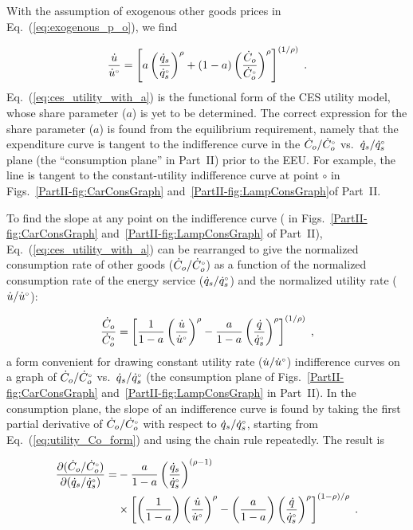 \documentclass[12pt]{article}\usepackage[]{graphicx}\usepackage[]{xcolor}
\begin{document}
With the assumption of exogenous other goods prices 
in Eq.~(\ref{eq:exogenous_p_o}), 
we find

\begin{equation} \label{eq:ces_utility_with_a}
  \frac{\dot{u}}{{}{\dot{u}}^{\scriptscriptstyle \circ}} = 
  \left[ a \left( \frac{\dot{q}_s}{{}{\dot{q}}^{\scriptscriptstyle \circ}_s} \right)^\rho 
        + (1-a) \left( \frac{\dot{C}_o}{{}{\dot{C}}^{\scriptscriptstyle \circ}_o} \right)^\rho  \right]^{(1/\rho)} \; .
\end{equation}
%
Eq.~(\ref{eq:ces_utility_with_a}) is the functional form of the CES utility model,
whose share parameter ($a$) is yet to be determined.
The correct expression for the share parameter ($a$) is found from the 
equilibrium requirement,
namely that the expenditure curve 
is tangent to the indifference curve
in the $\dot{C}_o/{}{\dot{C}}^{\scriptscriptstyle \circ}_o$ vs.\ $\dot{q}_s/{}{\dot{q}}^{\scriptscriptstyle \circ}_s$ plane
(the ``consumption plane'' in Part~II)
prior to the EEU.
For example, the \circcirc{} line is tangent 
to the constant-utility 
indifference curve \iicirc{} at point $\circ$
in Figs.~\ref{PartII-fig:CarConsGraph} 
and~\ref{PartII-fig:LampConsGraph}of Part~II.

To find the slope at any point on the indifference curve 
(\iicirc{} in Figs.~\ref{PartII-fig:CarConsGraph} 
and~\ref{PartII-fig:LampConsGraph} of Part~II),
Eq.~(\ref{eq:ces_utility_with_a}) can be rearranged to give 
the normalized consumption rate of other goods ($\dot{C}_o/{}{\dot{C}}^{\scriptscriptstyle \circ}_o$)
as a function of the normalized consumption rate of the energy service
($\dot{q}_s/{}{\dot{q}}^{\scriptscriptstyle \circ}_s$)
and the normalized utility rate ($\dot{u}/{}{\dot{u}}^{\scriptscriptstyle \circ}$):

\begin{equation} \label{eq:utility_Co_form}
  \frac{\dot{C}_o}{{}{\dot{C}}^{\scriptscriptstyle \circ}_o} = 
      \left[ \frac{1}{1 - a} \left( \frac{\dot{u}}{{}{\dot{u}}^{\scriptscriptstyle \circ}} \right)^\rho 
            - \frac{a}{1 - a} \left( \frac{\dot{q}}{{}{\dot{q}}^{\scriptscriptstyle \circ}_s} \right)^\rho \right]^{(1/\rho)} \; ,
\end{equation}
%
a form convenient for drawing 
constant utility rate ($\dot{u}/{}{\dot{u}}^{\scriptscriptstyle \circ}$) indifference curves on a graph of
$\dot{C}_o/{}{\dot{C}}^{\scriptscriptstyle \circ}_o$ vs.\ 
$\dot{q}_s/{}{\dot{q}}^{\scriptscriptstyle \circ}_s$ 
(the consumption plane of
Figs.~\ref{PartII-fig:CarConsGraph} 
and~\ref{PartII-fig:LampConsGraph} in Part~II).
In the consumption plane, 
the slope of an indifference curve is found by taking the first 
partial derivative of $\dot{C}_o/{}{\dot{C}}^{\scriptscriptstyle \circ}_o$
with respect to $\dot{q}_s/{}{\dot{q}}^{\scriptscriptstyle \circ}_s$,
starting from Eq.~(\ref{eq:utility_Co_form}) and 
using the chain rule repeatedly.
The result is

\begin{align} \label{eq:slope_indifference_curve}
  \frac{\partial (\dot{C}_o/{}{\dot{C}}^{\scriptscriptstyle \circ}_o)}{\partial (\dot{q}_s/{}{\dot{q}}^{\scriptscriptstyle \circ}_s)} =&
        -\frac{a}{1 - a} \left( \frac{\dot{q}_s}{{}{\dot{q}}^{\scriptscriptstyle \circ}_s} \right)^{(\rho -1)} \nonumber  \\
        &\times \left[ \left( \frac{1}{1 - a} \right) \left( \frac{\dot{u}}{{}{\dot{u}}^{\scriptscriptstyle \circ}} \right)^\rho
                - \left( \frac{a}{1 - a} \right) 
                          \left( \frac{\dot{q}}{{}{\dot{q}}^{\scriptscriptstyle \circ}_s} \right)^\rho \right]^{(1 - \rho)/\rho} \; .
\end{align}
\end{document}
